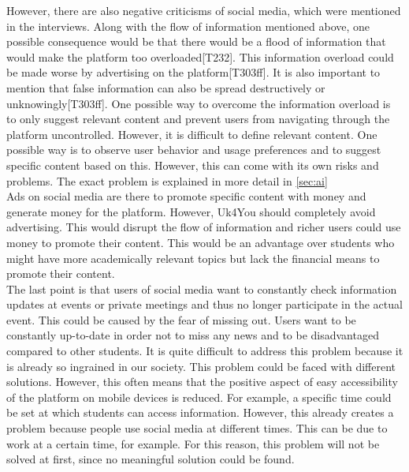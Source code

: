 However, there are also negative criticisms of social media, which were mentioned in the interviews.
Along with the flow of information mentioned above, one possible consequence would be that there would be a flood of information that would make the platform too overloaded[T232].
This information overload could be made worse by advertising on the platform[T303ff].
It is also important to mention that false information can also be spread destructively or unknowingly[T303ff].
One possible way to overcome the information overload is to only suggest relevant content and prevent users from navigating through the platform uncontrolled.
However, it is difficult to define relevant content.
One possible way is to observe user behavior and usage preferences and to suggest specific content based on this.
However, this can come with its own risks and problems.
The exact problem is explained in more detail in \autoref{sec:ai}\\

Ads on social media are there to promote specific content with money and generate money for the platform.
However, Uk4You should completely avoid advertising.
This would disrupt the flow of information and richer users could use money to promote their content.
This would be an advantage over students who might have more academically relevant topics but lack the financial means to promote their content.\\

The last point is that users of social media want to constantly check information updates at events or private meetings and thus no longer participate in the actual event.
This could be caused by the fear of missing out.
Users want to be constantly up-to-date in order not to miss any news and to be disadvantaged compared to other students.
It is quite difficult to address this problem because it is already so ingrained in our society.
This problem could be faced with different solutions.
However, this often means that the positive aspect of easy accessibility of the platform on mobile devices is reduced.
For example, a specific time could be set at which students can access information.
However, this already creates a problem because people use social media at different times.
This can be due to work at a certain time, for example.
For this reason, this problem will not be solved at first, since no meaningful solution could be found.


